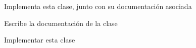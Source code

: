 
\begin{DoxyRefList}
\item[\label{todo__todo000001}%
\hypertarget{todo__todo000001}{}%
Class \hyperlink{classconjunto}{conjunto} ]Implementa esta clase, junto con su documentación asociada  
\item[\label{todo__todo000004}%
\hypertarget{todo__todo000004}{}%
Class \hyperlink{classfecha}{fecha} ]Escribe la documentación de la clase 

Implementar esta clase
\end{DoxyRefList}